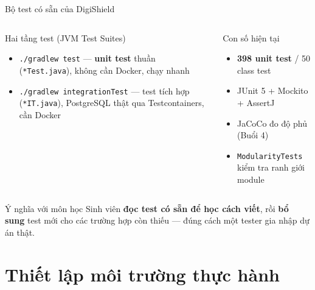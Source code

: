 \documentclass[aspectratio=169,12pt]{beamer}
\begin{document}
\begin{frame}{Bộ test có sẵn của DigiShield}
  \begin{columns}
    \begin{block}{Hai tầng test (JVM Test Suites)}
      \small
      \begin{itemize}
        \item \texttt{./gradlew test} --- \textbf{unit test} thuần
              (\texttt{*Test.java}), không cần Docker, chạy nhanh
        \item \texttt{./gradlew integrationTest} --- test tích hợp
              (\texttt{*IT.java}), PostgreSQL thật qua Testcontainers, cần Docker
      \end{itemize}
    \end{block}

    \begin{block}{Con số hiện tại}
      \small
      \begin{itemize}
        \item \textbf{398 unit test} / 50 class test
        \item JUnit 5 + Mockito + AssertJ
        \item JaCoCo đo độ phủ (Buổi 4)
        \item \texttt{ModularityTests} kiểm tra ranh giới module
      \end{itemize}
    \end{block}
  \end{columns}

  \vspace{0.4em}
  \begin{exampleblock}{Ý nghĩa với môn học}
    Sinh viên \textbf{đọc test có sẵn để học cách viết}, rồi \textbf{bổ sung}
    test mới cho các trường hợp còn thiếu --- đúng cách một tester gia nhập
    dự án thật.
  \end{exampleblock}
\end{frame}

\section{Thiết lập môi trường thực hành}
\end{document}
